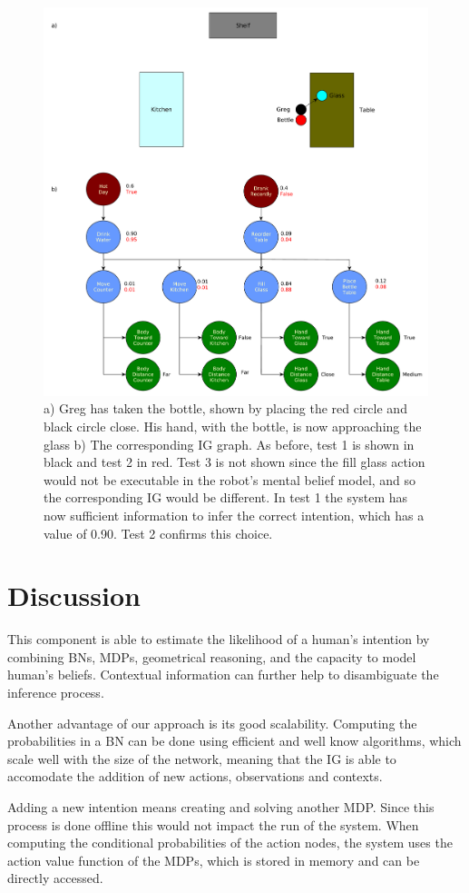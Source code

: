 \clearpage
 \begin{figure}[ht!]
	\centering
	\includegraphics[scale=0.4]{img/observer/ig_exp3.pdf}
	\caption[IG Example 3]{a) Greg has taken the bottle, shown by placing the red circle and black circle close. His hand, with the bottle, is now approaching the glass b) The corresponding IG graph. As before, test 1 is shown in black and test 2 in red. Test 3 is not shown since the fill glass action would not be executable in the robot's mental belief model, and so the corresponding IG would be different. In test 1 the system has now sufficient information to infer the correct intention, which has a value of 0.90. Test 2 confirms this choice.}
	\label{fig:intention-ig_exp3}
\end{figure}
\clearpage

\section{Discussion}

This component is able to estimate the likelihood of a human's intention by combining BNs, MDPs, geometrical reasoning, and the capacity to model human's beliefs. Contextual information can further help to disambiguate the inference process. 

Another advantage of our approach is its good scalability. Computing the probabilities in a BN can be done using efficient and well know algorithms, which scale well with the size of the network, meaning that the IG is able to accomodate the addition of new actions, observations and contexts. 

Adding a new intention means creating and solving another MDP. Since this process is done offline this would not impact the run of the system. When computing the conditional probabilities of the action nodes, the system uses the action value function of the MDPs, which is stored in memory and can be directly accessed.
